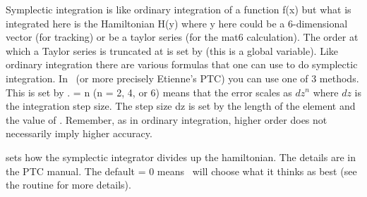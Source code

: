 Symplectic integration is like ordinary integration of a function f(x)
but what is integrated here is the Hamiltonian H(y) where y here could
be a 6-dimensional vector (for tracking) or be a taylor series (for
the mat6 calculation). The order at which a Taylor series is truncated
at is set by  (this is a global variable). Like
ordinary integration there are various formulas that one can use to do
symplectic integration. In \bmad\ (or more precisely Etienne's PTC)
you can use one of 3 methods. This is set by . 
 = n (n = 2, 4, or 6)
means that the error scales as $dz^n$ where $dz$ is the integration step
size. The step size dz is set by the length of the element and the
value of . Remember, as in ordinary integration, higher
order does not necessarily imply higher accuracy.

 sets how the symplectic integrator divides up the hamiltonian.
The details are in the PTC manual. The default  = 0
means \bmad\ will choose what it thinks as best (see the routine
 for more details).
